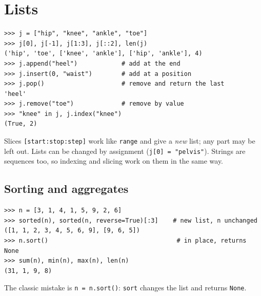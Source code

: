 \section*{Lists}
\begin{center}
\label{fig:py4_list}
\end{center}
\begin{verbatim}
>>> j = ["hip", "knee", "ankle", "toe"]
>>> j[0], j[-1], j[1:3], j[::2], len(j)
('hip', 'toe', ['knee', 'ankle'], ['hip', 'ankle'], 4)
>>> j.append("heel")            # add at the end
>>> j.insert(0, "waist")        # add at a position
>>> j.pop()                     # remove and return the last
'heel'
>>> j.remove("toe")             # remove by value
>>> "knee" in j, j.index("knee")
(True, 2)
\end{verbatim}
Slices \texttt{[start:stop:step]} work like \texttt{range} and give a \emph{new} list; any part may be left out. Lists can be changed by assignment (\verb!j[0] = "pelvis"!). Strings are sequences too, so indexing and slicing work on them in the same way.

\subsection*{Sorting and aggregates}
\begin{verbatim}
>>> n = [3, 1, 4, 1, 5, 9, 2, 6]
>>> sorted(n), sorted(n, reverse=True)[:3]    # new list, n unchanged
([1, 1, 2, 3, 4, 5, 6, 9], [9, 6, 5])
>>> n.sort()                                   # in place, returns None
>>> sum(n), min(n), max(n), len(n)
(31, 1, 9, 8)
\end{verbatim}
The classic mistake is \verb!n = n.sort()!: \texttt{sort} changes the list and returns \texttt{None}.

